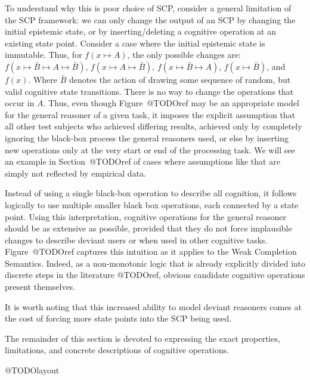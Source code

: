 \documentclass[
11pt, %
english, %
singlespacing, %
headsepline, %
]{MastersDoctoralThesis} %
\begin{document}
To understand why this is poor choice of SCP, consider a general limitation of the SCP framework: we can only change the output of an SCP by changing the initial epistemic state, or by inserting/deleting a cognitive operation at an existing state point. Consider a case where the initial epistemic state is immutable. Thus, for $f(x \longmapsto A)$, the only possible changes are: $f(x \longmapsto \bar{B} \longmapsto A \longmapsto \bar{B})$, $f(x \longmapsto A \longmapsto \bar{B})$, $f(x \longmapsto \bar{B} \longmapsto A)$, $f(x \longmapsto \bar{B})$, and $f(x)$. Where $\bar{B}$ denotes the action of drawing some sequence of random, but valid cognitive state transitions. There is no way to change the operations that occur in $A$. Thus, even though Figure~@TODOref may be an appropriate model for the general reasoner of a given task, it imposes the explicit assumption that all other test subjects who achieved differing results, achieved only by completely ignoring the black-box process the general reasoners used, or else by inserting new operations only at the very start or end of the processing task. We will see an example in Section~@TODOref of cases where assumptions like that are simply not reflected by empirical data. 

Instead of using a single black-box operation to describe all cognition, it follows logically to use multiple smaller black box operations, each connected by a state point. Using this interpretation, cognitive operations for the general reasoner should be as extensive as possible, provided that they do not force implausible changes to describe deviant users or when used in other cognitive tasks. Figure~@TODOref captures this intuition as it applies to the Weak Completion Semantics. Indeed, as a non-monotonic logic that is already explicitly divided into discrete steps in the literature @TODOref, obvious candidate cognitive operations present themselves.

It is worth noting that this increased ability to model deviant reasoners comes at the cost of forcing more state points into the SCP being used.

The remainder of this section is devoted to expressing the exact properties, limitations, and concrete descriptions of cognitive operations.

@TODOlayout
\end{document}
